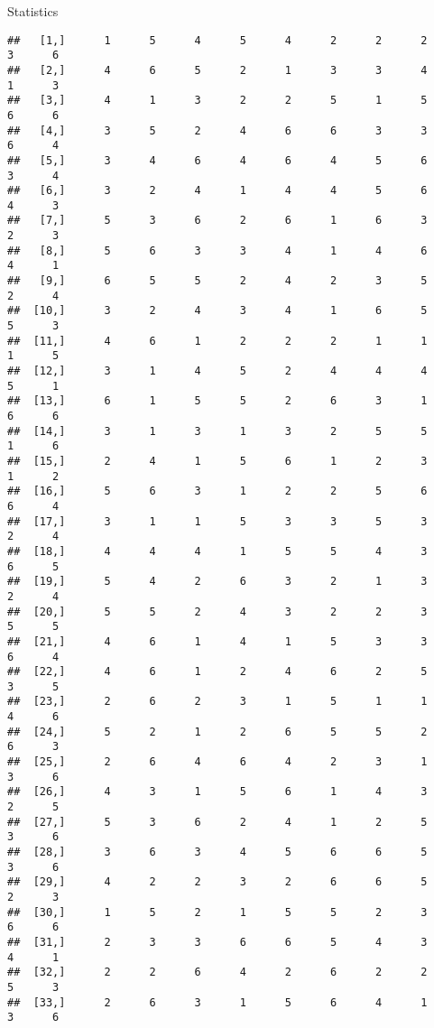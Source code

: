 \documentclass[
  ignorenonframetext,
]{beamer}
\begin{document}
\begin{frame}[fragile]{Statistics}
\begin{verbatim}
##   [1,]      1      5      4      5      4      2      2      2      3      6
##   [2,]      4      6      5      2      1      3      3      4      1      3
##   [3,]      4      1      3      2      2      5      1      5      6      6
##   [4,]      3      5      2      4      6      6      3      3      6      4
##   [5,]      3      4      6      4      6      4      5      6      3      4
##   [6,]      3      2      4      1      4      4      5      6      4      3
##   [7,]      5      3      6      2      6      1      6      3      2      3
##   [8,]      5      6      3      3      4      1      4      6      4      1
##   [9,]      6      5      5      2      4      2      3      5      2      4
##  [10,]      3      2      4      3      4      1      6      5      5      3
##  [11,]      4      6      1      2      2      2      1      1      1      5
##  [12,]      3      1      4      5      2      4      4      4      5      1
##  [13,]      6      1      5      5      2      6      3      1      6      6
##  [14,]      3      1      3      1      3      2      5      5      1      6
##  [15,]      2      4      1      5      6      1      2      3      1      2
##  [16,]      5      6      3      1      2      2      5      6      6      4
##  [17,]      3      1      1      5      3      3      5      3      2      4
##  [18,]      4      4      4      1      5      5      4      3      6      5
##  [19,]      5      4      2      6      3      2      1      3      2      4
##  [20,]      5      5      2      4      3      2      2      3      5      5
##  [21,]      4      6      1      4      1      5      3      3      6      4
##  [22,]      4      6      1      2      4      6      2      5      3      5
##  [23,]      2      6      2      3      1      5      1      1      4      6
##  [24,]      5      2      1      2      6      5      5      2      6      3
##  [25,]      2      6      4      6      4      2      3      1      3      6
##  [26,]      4      3      1      5      6      1      4      3      2      5
##  [27,]      5      3      6      2      4      1      2      5      3      6
##  [28,]      3      6      3      4      5      6      6      5      3      6
##  [29,]      4      2      2      3      2      6      6      5      2      3
##  [30,]      1      5      2      1      5      5      2      3      6      6
##  [31,]      2      3      3      6      6      5      4      3      4      1
##  [32,]      2      2      6      4      2      6      2      2      5      3
##  [33,]      2      6      3      1      5      6      4      1      3      6

\end{verbatim}
\end{frame}
\end{document}
